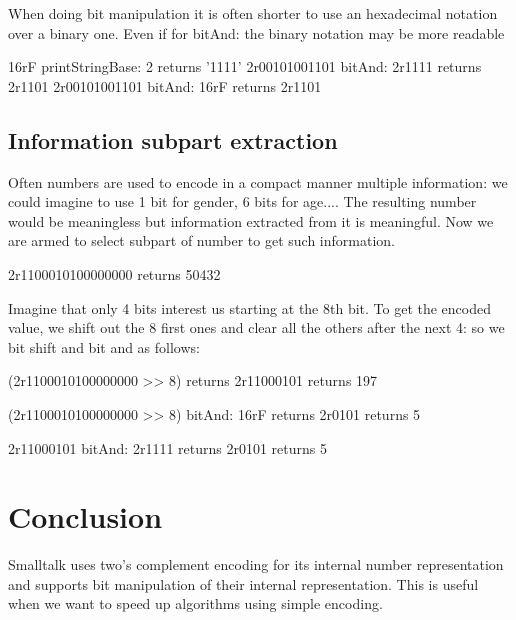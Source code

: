 \documentclass[a4paper,10pt,twoside]{book}
\begin{document}
When doing bit manipulation it is often shorter to use an hexadecimal notation over a binary one. Even if for bitAnd: the binary notation may be more readable
\begin{code}{}
16rF printStringBase: 2
	returns '1111'
2r00101001101 bitAnd: 2r1111	
	returns 2r1101
2r00101001101 bitAnd: 16rF
	returns 2r1101
\end{code}


\subsection*{Information subpart extraction}
Often numbers are used to encode in a compact manner multiple information: we could imagine to use 1 bit for gender, 6 bits for age.... The resulting number would be meaningless but information extracted from it is meaningful.
Now we are armed to select subpart of number to get such information. 

\begin{code}{}
2r1100010100000000 
	returns 50432
\end{code}

Imagine that only 4 bits interest us starting at the 8th bit.
To get the encoded value, we shift out the 8 first ones and clear all the others after the next 4: so we bit shift and bit and as follows:

\begin{code}{}
(2r1100010100000000 >> 8)
	returns 2r11000101
	returns 197

(2r1100010100000000 >> 8) bitAnd: 16rF	
	returns 2r0101	
	returns 5
	
2r11000101 bitAnd: 2r1111
	returns 2r0101	
	returns 5
\end{code}

\section{Conclusion}

Smalltalk uses two's complement encoding for its internal number representation and supports  bit manipulation of their internal representation. This is useful when we want to speed up algorithms using simple encoding.


\ifx\wholebook\relax\else
   
   
\end{document}
